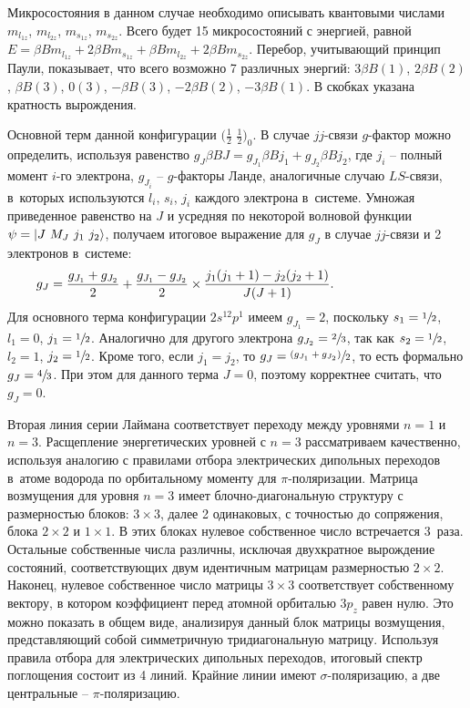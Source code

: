  Микросостояния в данном случае необходимо описывать квантовыми числами $m_{l_{1z}}$, $m_{l_{2z}}$, $m_{s_{1z}}$, $m_{s_{2z}}$. Всего будет 15 микросостояний с энергией, равной $E=\beta B m_{l_{1z}} + 2 \beta B m_{s_{1z}} + \beta B m_{l_{2z}} + 2 \beta B m_{s_{2z}}$. Перебор, учитывающий принцип Паули, показывает, что всего возможно 7 различных энергий: $3 \beta B (1)$, $2 \beta B (2)$, $\beta B (3)$, $0 (3)$, $-\beta B (3)$, $-2 \beta B (2)$, $-3 \beta B (1)$. В скобках указана кратность вырождения.\par
{} Основной терм данной конфигурации $\Big( \frac12\,\,\frac12\Big)_{0}$. В случае $jj$-связи $g$-фактор можно определить, используя равенство $g_J\beta B J=g_{J_1}\beta B j_1+g_{J_2}\beta B j_2$, где $j_i$ – полный момент $i$-го электрона, $g_{J_i}$ – $g$-факторы Ланде, аналогичные случаю $LS$-связи, в~которых используются $l_i$, $s_i$, $j_i$ каждого электрона в~системе. Умножая приведенное равенство на $J$ и усредняя по некоторой волновой функции $\psi=\ket{J\,\,M_J\,\,j_1\,\,j_2}$, получаем итоговое выражение для $g_J$ в случае $jj$-связи и 2 электронов в~системе:
\begin{equation*}
\begin{aligned}
& g_J= \dfrac{g_{J_1}+g_{J_2}}{2}+ \dfrac{g_{J_1}-g_{J_2}}{2} \times  \dfrac{j_1(j_1+1) - j_2(j_2+1)}{J(J+1)}. \hspace{25mm}
\end{aligned}
\end{equation*}
Для основного терма конфигурации $2s^12p^1$ имеем $g_{J_1}=2$, поскольку $s_1=\sfrac12$, $l_1=0$, $j_1=\sfrac12$. Аналогично для другого электрона $g_{J_2}=\sfrac23$, так как $s_2=\sfrac12$, $l_2=1$, $j_2=\sfrac12$. Кроме того, если $j_1=j_2$, то $g_J=\sfrac{(g_{J_1}+g_{J_2})}{2}$, то есть формально $g_J=\sfrac43$. При этом для данного терма $J=0$, поэтому корректнее считать, что $g_J=0$.\par
{} Вторая линия серии Лаймана соответствует переходу между уровнями $n=1$ и $n=3$. Расщепление энергетических уровней с $n=3$ рассматриваем качественно, используя аналогию с правилами отбора электрических дипольных переходов в~атоме водорода по орбитальному моменту для $\pi$-поляризации. Матрица возмущения для уровня $n=3$ имеет блочно-диагональную структуру с размерностью блоков: $3 \times 3$, далее 2 одинаковых, с точностью до сопряжения, блока $2 \times 2$ и $1 \times 1$. В этих блоках нулевое собственное число встречается 3~раза. Остальные собственные числа различны, исключая двухкратное вырождение состояний, соответствующих двум идентичным матрицам размерностью $2 \times 2$. Наконец, нулевое собственное число матрицы $3 \times 3$ соответствует собственному вектору, в котором коэффициент перед атомной орбиталью $3p_z$ равен нулю. Это можно показать в общем виде, анализируя данный блок матрицы возмущения, представляющий собой симметричную тридиагональную матрицу. Используя правила отбора для электрических дипольных переходов, итоговый спектр поглощения состоит из 4 линий. Крайние линии имеют $\sigma$-поляризацию, а две центральные – $\pi$-поляризацию.\par
